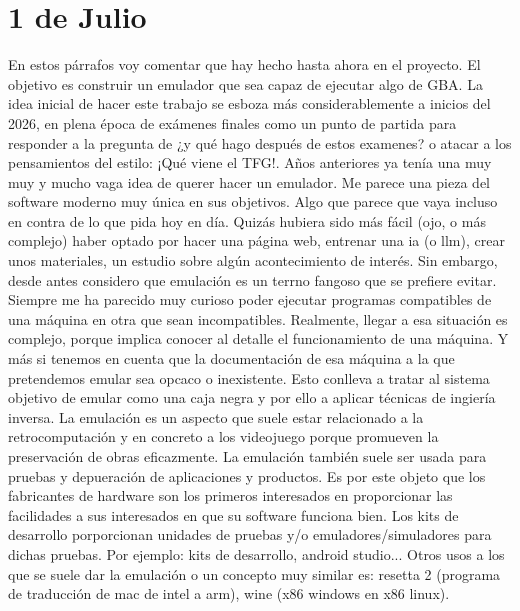 \section{1 de Julio}
\label{sec:1-de-julio}

En estos párrafos voy comentar que hay hecho hasta ahora en el proyecto. El objetivo es construir un emulador que sea capaz de ejecutar algo de GBA. La idea inicial de hacer este trabajo se esboza más considerablemente a inicios del 2026, en plena época de exámenes finales como un punto de partida para responder a la pregunta de ¿y qué hago después de estos examenes? o atacar a los pensamientos del estilo: ¡Qué viene el TFG!. Años anteriores ya tenía una muy muy y mucho vaga idea de querer hacer un emulador. Me parece una pieza del software moderno muy única en sus objetivos. Algo que parece que vaya incluso en contra de lo que pida hoy en día. Quizás hubiera sido más fácil (ojo, o más complejo) haber optado por hacer una página web, entrenar una ia (o llm), crear unos materiales, un estudio sobre algún acontecimiento de interés. Sin embargo, desde antes considero que emulación es un terrno fangoso que se prefiere evitar. Siempre me ha parecido muy curioso poder ejecutar programas compatibles de una máquina en otra que sean incompatibles. Realmente, llegar a esa situación es complejo, porque implica conocer al detalle el funcionamiento de una máquina. Y más si tenemos en cuenta que la documentación de esa máquina a la que pretendemos emular sea opcaco o inexistente. Esto conlleva a tratar al sistema objetivo de emular como una caja negra y por ello a aplicar técnicas de ingiería inversa. La emulación es un aspecto que suele estar relacionado a la retrocomputación y en concreto a los videojuego porque promueven la preservación de obras eficazmente. La emulación también suele ser usada para pruebas y depueración de aplicaciones y productos. Es por este objeto que los fabricantes de hardware son los primeros interesados en proporcionar las facilidades a sus interesados en que su software funciona bien. Los kits de desarrollo porporcionan unidades de pruebas y/o emuladores/simuladores para dichas pruebas. Por ejemplo: kits de desarrollo, android studio... Otros usos a los que se suele dar la emulación o un concepto muy similar es: resetta 2 (programa de traducción de mac de intel a arm), wine (x86 windows en x86 linux).

